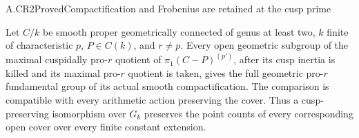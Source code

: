 \begin{claim}{A.CR2}{Proved}{Compactification and Frobenius are retained at the cusp prime}

Let $C/k$ be smooth proper geometrically connected of genus at least two,
$k$ finite of characteristic $p$, $P\in C(k)$, and $r\ne p$.
Every open geometric subgroup of the maximal cuspidally pro-$r$
quotient of $\pi_1(C-P)^{(p')}$, after its cusp inertia is killed and
its maximal pro-$r$ quotient is taken, gives the full geometric
pro-$r$ fundamental group of its actual smooth compactification.
The comparison is compatible with every arithmetic action preserving
the cover. Thus a cusp-preserving isomorphism over $G_k$ preserves
the point counts of every corresponding open cover over every
finite constant extension.

\end{claim}

